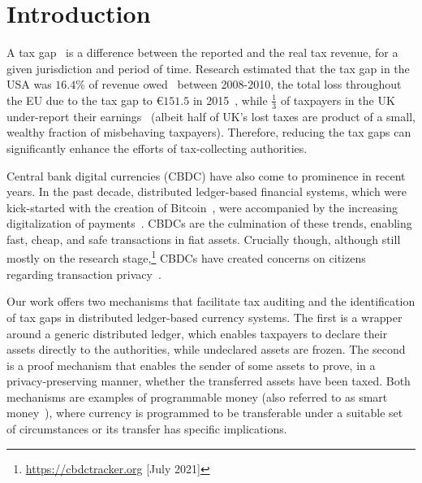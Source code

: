 \section{Introduction}\label{sec:introduction}

A tax gap~\cite{comission2018taxgaps} is a difference between the reported and
the real tax revenue, for a given jurisdiction and period of time. Research
estimated that the tax gap in the USA was $16.4$\% of revenue
owed~\cite{internal2016federal} between 2008-2010, the total loss throughout
the EU due to the tax gap to €$151.5$ in 2015~\cite{murphy2018resources}, while
$\frac{1}{3}$ of taxpayers in the UK under-report their
earnings~\cite{advani2020does} (albeit half of UK's lost taxes are product of a
small, wealthy fraction of misbehaving taxpayers). Therefore, reducing the tax
gaps can significantly enhance the efforts of tax-collecting authorities.

Central bank digital currencies (CBDC) have also come to prominence in recent
years. In the past decade, distributed ledger-based financial systems, which
were kick-started with the creation of Bitcoin~\cite{nakamoto2008bitcoin}, were
accompanied by the increasing digitalization of payments~\cite{bis2011digital}.
CBDCs are the culmination of these trends, enabling fast, cheap, and safe
transactions in fiat assets. Crucially though, although still mostly on the
research stage,\footnote{\url{https://cbdctracker.org} [July 2021]} CBDCs have
created concerns on citizens regarding transaction
privacy~\cite{ecb2021cbdcprivacy}.

Our work offers two mechanisms that facilitate tax auditing and the
identification of tax gaps in distributed ledger-based currency systems. The
first is a wrapper around a generic distributed ledger, which enables taxpayers
to declare their assets directly to the authorities, while undeclared assets
are frozen. The second is a proof mechanism that enables the sender of some
assets to prove, in a privacy-preserving manner, whether the transferred assets
have been taxed. Both mechanisms are examples of programmable money (also referred to as smart money~\cite{AHA}),
where currency is programmed to be transferable under a suitable set of  circumstances or its transfer has specific implications. 
